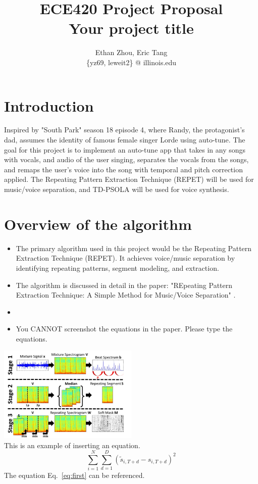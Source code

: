 \documentclass[journal,onecolumn, draftclsnofoot, 12pt]{IEEEtran}
\title{ECE420 Project Proposal\\ Your project title }
\author{Ethan Zhou, Eric Tang \\
\{yz69, leweit2\} @ illinois.edu}
\begin{document}
\maketitle
\section{Introduction}
Inspired by "South Park" season 18 episode 4, where Randy, the protagonist's dad, assumes the identity of famous female singer Lorde using auto-tune. The goal for this project is to implement an auto-tune app that takes in any songs with vocals, and audio of the user singing, separates the vocals from the songs, and remaps the user's voice into the song with temporal and pitch correction applied. The Repeating Pattern Extraction Technique (REPET) will be used for music/voice separation, and TD-PSOLA will be used for voice synthesis.

\section{Overview of the algorithm}
\begin{itemize}
    \item The primary algorithm used in this project would be the Repeating Pattern Extraction Technique (REPET). It achieves voice/music separation by identifying repeating patterns, segment modeling, and extraction.
    \item The algorithm is discussed in detail in the paper: "REpeating Pattern Extraction Technique: A Simple Method for Music/Voice Separation" \cite{rafii2012repeating}. 
    \item 
    \item You CANNOT screenshot the equations in the paper. Please type the equations. 
\end{itemize}
\includegraphics[shift right = 5cm, width=0.5\textwidth]{Figure1.png}\\



This is an example of inserting an equation. 
\begin{equation} \label{eq:first}
    \sum_{i=1}^N  \sum_{d=1}^D (\widetilde{s}_{i, T+d} - {s}_{i, T+d})^2
\end{equation}
The equation Eq.~\ref{eq:first} can be referenced. 
\end{document}
